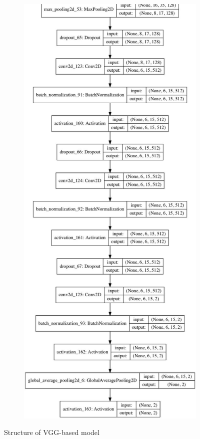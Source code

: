 \begin{figure}[htbp]
\begin{subfigure}[b]{0.45\linewidth}
     \end{subfigure}
          \begin{subfigure}[b]{0.45\linewidth}
      \includegraphics[scale=0.35]{Figs/Appen/model_plot3.png}
     \end{subfigure}
  \caption{Structure of VGG-based model}
  \label{Fig:shapevgg}
\end{figure}